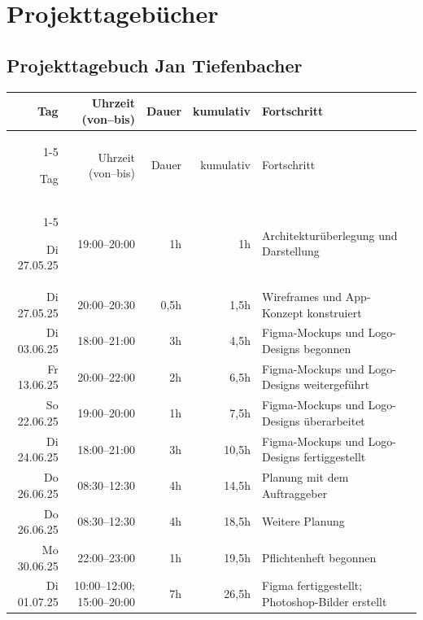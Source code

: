 \section{Projekttagebücher}
\subsection{Projekttagebuch Jan Tiefenbacher}
\begin{longtable}{r | r | r | r | p{}}
	Tag & Uhrzeit (von--bis) & Dauer & kumulativ & Fortschritt \\
	\cline{1-5}
	\endfirsthead

	Tag & Uhrzeit (von--bis) & Dauer & kumulativ & Fortschritt \\
	\cline{1-5}
	\endhead

	Di 27.05.25 & 19:00--20:00 & 1h & 1h & Architekturüberlegung und Darstellung \\
	Di 27.05.25 & 20:00--20:30 & 0{,}5h & 1{,}5h & Wireframes und App-Konzept konstruiert \\

	Di 03.06.25 & 18:00--21:00 & 3h & 4{,}5h & Figma-Mockups und Logo-Designs begonnen \\
	Fr 13.06.25 & 20:00--22:00 & 2h & 6{,}5h & Figma-Mockups und Logo-Designs weitergeführt \\
	So 22.06.25 & 19:00--20:00 & 1h & 7{,}5h & Figma-Mockups und Logo-Designs überarbeitet \\
	Di 24.06.25 & 18:00--21:00 & 3h & 10{,}5h & Figma-Mockups und Logo-Designs fertiggestellt \\

	Do 26.06.25 & 08:30--12:30 & 4h & 14{,}5h & Planung mit dem Auftraggeber \\
	Do 26.06.25 & 08:30--12:30 & 4h & 18{,}5h & Weitere Planung \\

	Mo 30.06.25 & 22:00--23:00 & 1h & 19{,}5h & Pflichtenheft begonnen \\
	Di 01.07.25 & 10:00--12:00; 15:00--20:00 & 7h & 26{,}5h & Figma fertiggestellt; Photoshop-Bilder erstellt \\


\end{longtable}
